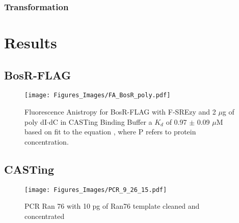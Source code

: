 \documentclass[12pt,twoside]{reedthesis}
\begin{document}
   \subsection*{Transformation}
   

   
  \chapter*{Results}
  
  
  \section*{BosR-FLAG}
  
         	\begin{figure}[h]
         		\centering
         		\texttt{[image: Figures\_Images/FA\_BosR\_poly.pdf]}
         		\caption[Determining DNA Activity of BosR-FLAG by Fluorescence Anistropy]{Fluorescence Anistropy for BosR-FLAG with F-SREzy and 2 $\mu$g of poly dI$\cdot$dC in CASTing Binding Buffer  a $K_{d}$ of 0.97 $\pm$ 0.09 $\mu$M based on fit to the equation \FAstdfit , where P refers to protein concentration.}
         		\label{BosRFLAGFApoly}
         	\end{figure}
  
  
  \section*{CASTing} 
  
    		 \begin{figure}[h!tbp]
    		\centering
    		\texttt{[image: Figures\_Images/PCR\_9\_26\_15.pdf]}
    		\caption[PCR to Create Pool of Random DNA]{PCR Ran 76 with 10 pg of Ran76 template cleaned and concentrated}
    		\label{PCRRan76}
    	\end{figure}
 
\end{document}

